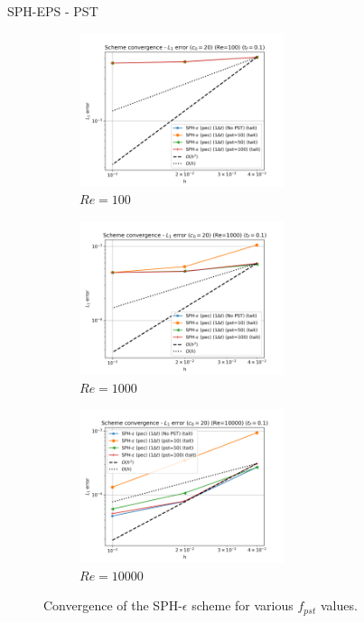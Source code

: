 SPH-EPS - PST 
\begin{figure}[H]
  \begin{subfigure}{7cm}
  \centering\includegraphics[width=6cm]{Code-Figures/mon2017/pst/dt_pois_conv_c0_20_re_100.png}
  \caption{$Re = 100$}
  \end{subfigure}
  \begin{subfigure}{7cm}
  \centering\includegraphics[width=6cm]{Code-Figures/mon2017/pst/dt_pois_conv_c0_20_re_1000.png}
  \caption{$Re = 1000$}
  \end{subfigure}
  \begin{subfigure}{7cm}
  \centering\includegraphics[width=6cm]{Code-Figures/mon2017/pst/dt_pois_conv_c0_20_re_10000.png}
  \caption{$Re = 10000$}
  \end{subfigure}
  \caption{Convergence of the SPH-$\epsilon$ scheme for various $f_{pst}$ values.}
  \label{fig:sph-eps-pst}
\end{figure}

